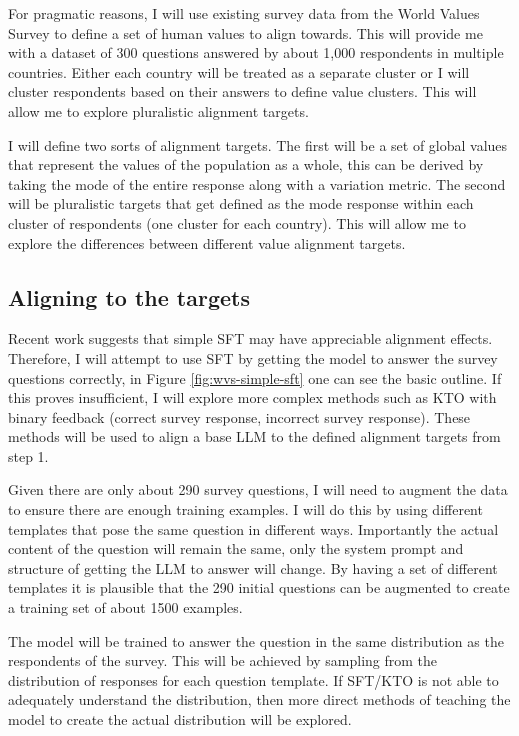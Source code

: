 For pragmatic reasons, I will use existing survey data from the World Values Survey to define a set of human values to align towards. This will provide me with a dataset of 300 questions answered by about 1,000 respondents in multiple countries. Either each country will be treated as a separate cluster or I will cluster respondents based on their answers to define value clusters. This will allow me to explore pluralistic alignment targets.

I will define two sorts of alignment targets. The first will be a set of global values that represent the values of the population as a whole, this can be derived by taking the mode of the entire response along with a variation metric. The second will be pluralistic targets that get defined as the mode response within each cluster of respondents (one cluster for each country). This will allow me to explore the differences between different value alignment targets.

\subsection{Aligning to the targets}

Recent work \cite{nieSurveytoBehaviorDownstreamAlignment2025} suggests that simple SFT may have appreciable alignment effects. Therefore, I will attempt to use SFT by getting the model to answer the survey questions correctly, in Figure \ref{fig:wvs-simple-sft} one can see the basic outline. If this proves insufficient, I will explore more complex methods such as KTO with binary feedback (correct survey response, incorrect survey response). These methods will be used to align a base LLM to the defined alignment targets from step 1.

Given there are only about 290 survey questions, I will need to augment the data to ensure there are enough training examples. I will do this by using different templates that pose the same question in different ways. Importantly the actual content of the question will remain the same, only the system prompt and structure of getting the LLM to answer will change. By having a set of different templates it is plausible that the 290 initial questions can be augmented to create a training set of about 1500 examples.

The model will be trained to answer the question in the same distribution as the respondents of the survey. This will be achieved by sampling from the distribution of responses for each question template. If SFT/KTO is not able to adequately understand the distribution, then more direct methods of teaching the model to create the actual distribution will be explored.



